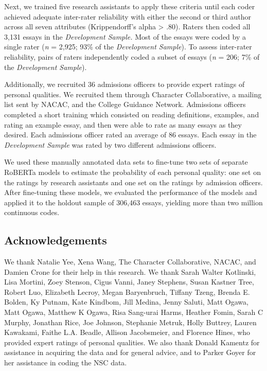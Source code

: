 \documentclass[11pt]{report}
\begin{document}
\begin{mainf}
Next, we trained five research assistants to apply these criteria until each coder achieved adequate inter-rater reliability with either the second or third author across all seven attributes (Krippendorff’s alpha > .80). Raters then coded all 3,131 essays in the \textit{Development Sample.} Most of the essays were coded by a single rater (\textit{n} = 2,925; 93\% of the \textit{Development Sample}). To assess inter-rater reliability, pairs of raters independently coded a subset of essays (\textit{n} = 206; 7\% of the \textit{Development Sample}). 

Additionally, we recruited 36 admissions officers to provide expert ratings of personal qualities. We recruited them through Character Collaborative, a mailing list sent by NACAC, and the College Guidance Network. Admissions officers completed a short training which consisted on reading definitions, examples, and rating an example essay, and then were able to rate as many essays as they desired. Each admissions officer rated an average of 86 essays. Each essay in the \textit{Development Sample} was rated by two different admissions officers.

We used these manually annotated data sets to fine-tune two sets of separate RoBERTa models to estimate the probability of each personal quality: one set on the ratings by research assistants and one set on the ratings by admission officers. After fine-tuning these models, we evaluated the performance of the models and applied it to the holdout sample of 306,463 essays, yielding more than two million continuous codes.


\subsection{Acknowledgements}
We thank Natalie Yee, Xena Wang, The Character Collaborative, NACAC, and Damien Crone for their help in this research. We thank Sarah Walter Kotlinski, Lisa Mortini, Zoey Stenson, Cigus Vanni, Janey Stephens, Susan Kastner Tree, Robert Luo, Elizabeth Lecroy, Megan Baryenbruch, Tiffany Tzeng, Brenda E. Bolden, Ky Putnam, Kate Kindbom, Jill Medina, Jenny Saluti, Matt Ogawa, Matt Ogawa, Matthew K Ogawa, Risa Sang-urai Harms, Heather Fomin, Sarah C Murphy, Jonathan Rice, Joe Johnson, Stephanie Metruk, Holly Buttrey, Lauren Kawakami, Faithe L.A. Beadle, Allison Jacobsmeier, and Florence Hines, who provided expert ratings of personal qualities. We also thank Donald Kamentz for assistance in acquiring the data and for general advice, and to Parker Goyer for her assistance in coding the NSC data. 


\end{mainf}
\end{document}
